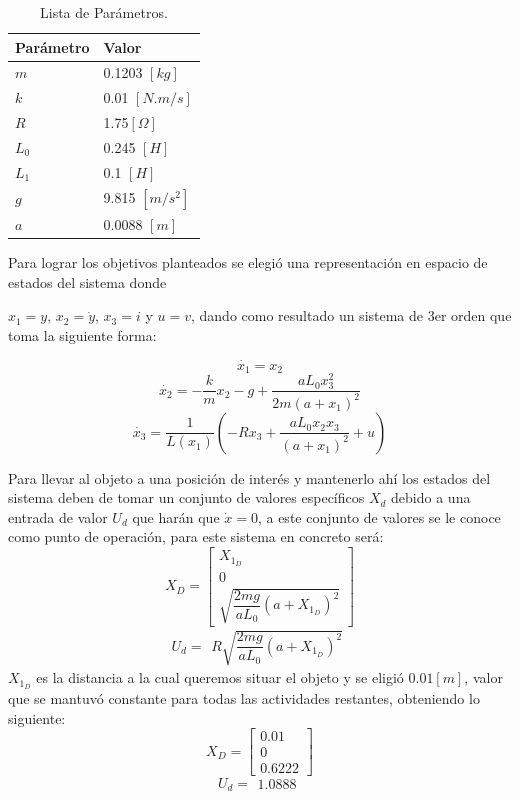 \documentclass[onecolumn,10pt]{article}
\begin{document}
\begin{table}[htbp]
\begin{center}
\begin{tabular}{|l|l|}
\hline
Par\'ametro & Valor \\
\hline \hline
$m$ & 0.1203 $[kg]$ \\ \hline
$k$ & 0.01 $[N.m/s]$\\ \hline
$R$ & 1.75$[\Omega]$\\ \hline
$L_0$ & 0.245 $[H]$ \\ \hline
$L_1$ & 0.1 $[H]$ \\ \hline
$g$ & 9.815 $[m/s^{2}]$ \\ \hline
$a$ & 0.0088 $[m]$ \\ \hline
\end{tabular}
\caption{Lista de Par\'ametros.}
\end{center}
\end{table}

Para lograr los objetivos planteados se elegi\'o una representaci\'on en espacio de estados del sistema donde 

$x_1=y$, $x_2=\dot{y}$, $x_3=i$ y $u=v$, dando como resultado un sistema de 3er orden que toma la siguiente forma:

$$
\dot{x_1}=x_2 
$$
$$
\dot{x_2}=-\dfrac{k}{m}x_2-g+\dfrac{aL_0x_3^{2}}{2m(a+x_1)^{2}}
$$
$$
\dot{x_3}=\dfrac{1}{L(x_1)}(-Rx_3+\dfrac{aL_0x_2x_3}{(a+x_1)^{2}}+u)
$$

Para llevar al objeto a una posici\'on de inter\'es y mantenerlo ah\'i los estados del sistema deben de tomar un conjunto de valores espec\'ificos $X_d$ debido a una entrada de valor $U_d$ que har\'an que $\dot{x}=0$, a este conjunto de valores se le conoce como punto de operaci\'on, para este sistema en concreto ser\'a:
$$
X_{D}=\begin{bmatrix}
X_{1_{D}} \\ 0 \\ \sqrt{\dfrac{2mg}{aL_0}(a+X_{1_{D}})^{2}} 
\end{bmatrix}
$$
$$
U_{d}=\begin{matrix}
R\sqrt{\dfrac{2mg}{aL_0}(a+X_{1_{D}})^{2}}
\end{matrix}
$$
$X_{1_{D}}$ es la distancia a la cual queremos situar el objeto y se eligi\'o $0.01[m]$, valor que se mantuv\'o constante para todas las actividades restantes, obteniendo lo siguiente:
$$
X_{D}=\begin{bmatrix}
0.01 \\ 0 \\ 0.6222 
\end{bmatrix}
$$
$$
U_{d}=\begin{matrix}
1.0888
\end{matrix}
$$
\end{document}
